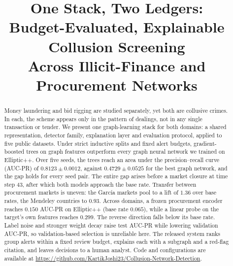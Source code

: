\documentclass[conference]{IEEEtran}
\begin{document}
\title{One Stack, Two Ledgers:\\
Budget-Evaluated, Explainable Collusion Screening\\
Across Illicit-Finance and Procurement Networks}

\author{%
}

\maketitle

\begin{abstract}
Money laundering and bid rigging are studied separately, yet both are
collusive crimes. In each, the scheme appears only in the pattern of dealings,
not in any single transaction or tender. We present one graph-learning stack
for both domains: a shared representation, detector family, explanation layer
and evaluation protocol, applied to five public datasets. Under strict
inductive splits and fixed alert budgets, gradient-boosted trees on graph
features outperform every graph neural network we trained on Elliptic++. Over
five seeds, the trees reach an area under the precision--recall curve (AUC-PR)
of $0.8123 \pm 0.0012$, against $0.4729 \pm 0.0525$ for the best graph network,
and the gap holds for every seed pair. The entire gap arises before a market
closure at time step 43, after which both models approach the base rate.
Transfer between procurement markets is uneven: the Garc\'ia markets pool to a
lift of $1.36$ over base rates, the Mendeley countries to $0.93$. Across domains, a frozen procurement encoder reaches $0.150$ AUC-PR on
Elliptic++ (base rate $0.065$), while a linear probe on the target's own
features reaches $0.299$. The reverse direction falls below its base rate. Label noise and
stronger weight decay raise test AUC-PR while lowering validation AUC-PR, so
validation-based selection is unreliable here. The released system ranks group
alerts within a fixed review budget, explains each with a subgraph and a
red-flag citation, and leaves decisions to a human analyst. Code and
configurations are available at
\url{https://github.com/KartikJoshi23/Collusion-Network-Detection}.
\end{abstract}
\end{document}
